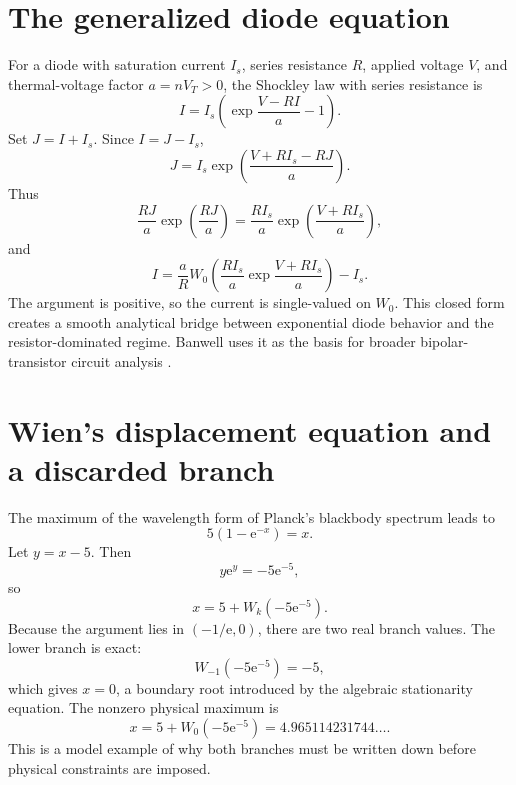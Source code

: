 \documentclass[11pt,openany]{book}
\newcommand{\e}{\mathrm{e}}
\theoremstyle{plain}
\theoremstyle{definition}
\theoremstyle{remark}
\begin{document}
\section{The generalized diode equation}
For a diode with saturation current \(I_s\), series resistance \(R\), applied
voltage \(V\), and thermal-voltage factor \(a=nV_T>0\), the Shockley law with
series resistance is
\begin{equation}\label{eq:diode}
       I=I_s\left(\exp\frac{V-RI}{a}-1\right).
\end{equation}
Set \(J=I+I_s\).  Since \(I=J-I_s\),
\[
 J=I_s\exp\left(\frac{V+RI_s-RJ}{a}\right).
\]
Thus
\[
       \frac{RJ}{a}\exp\left(\frac{RJ}{a}\right)
       =\frac{RI_s}{a}
        \exp\left(\frac{V+RI_s}{a}\right),
\]
and
\begin{equation}\label{eq:diodesolution}
 I=\frac{a}{R}W_0\!\left(
    \frac{RI_s}{a}\exp\frac{V+RI_s}{a}
   \right)-I_s.
\end{equation}
The argument is positive, so the current is single-valued on \(W_0\).  This
closed form creates a smooth analytical bridge between exponential diode
behavior and the resistor-dominated regime.  Banwell uses it as the basis for
broader bipolar-transistor circuit analysis \cite{Banwell2000}.

\section{Wien's displacement equation and a discarded branch}
The maximum of the wavelength form of Planck's blackbody spectrum leads to
\begin{equation}\label{eq:wien}
             5(1-\e^{-x})=x.
\end{equation}
Let \(y=x-5\).  Then
\[
       y\e^y=-5\e^{-5},
\]
so
\begin{equation}\label{eq:wiensolution}
       x=5+W_k(-5\e^{-5}).
\end{equation}
Because the argument lies in \((-1/\e,0)\), there are two real branch values.
The lower branch is exact:
\[
       W_{-1}(-5\e^{-5})=-5,
\]
which gives \(x=0\), a boundary root introduced by the algebraic stationarity
equation.  The nonzero physical maximum is
\[
       x=5+W_0(-5\e^{-5})
       =4.965114231744\ldots.
\]
This is a model example of why both branches must be written down before
physical constraints are imposed.
\end{document}
